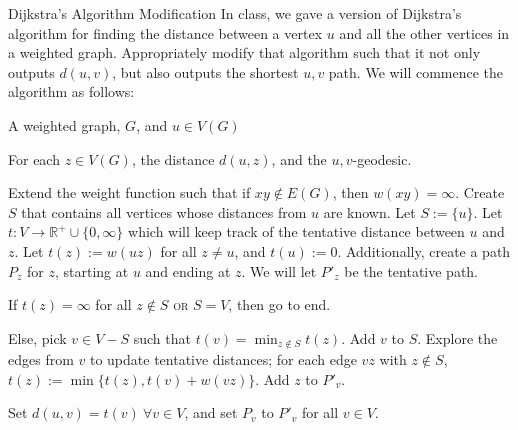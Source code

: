 \documentclass[10pt]{extarticle}
\title{}
\author{Avinash Iyer}
\date{}
\begin{document}
  \begin{problem}{Dijkstra's Algorithm Modification}
    In class, we gave a version of Dijkstra's algorithm for finding the distance between a vertex $u$ and all the other vertices in a weighted graph. Appropriately modify that algorithm such that it not only outputs $d(u,v)$, but also outputs the shortest $u,v$ path.
    \tcblower
    We will commence the algorithm as follows:
    \begin{description}[font=\normalfont\scshape]
      \item[Input] A weighted graph, $G$, and $u\in V(G)$
      \item[Output] For each $z\in V(G)$, the distance $d(u,z)$, and the $u,v$-geodesic.
      \item[Initialization]Extend the weight function such that if $xy\notin E(G)$, then $w(xy) = \infty$. Create $S$ that contains all vertices whose distances from $u$ are known. Let $S := \{u\}$. Let $t:V\rightarrow \mathbb{R}^+ \cup \{0,\infty\}$ which will keep track of the tentative distance between $u$ and $z$. Let $t(z) := w(uz)$ for all $z\neq u$, and $t(u) := 0$. Additionally, create a path $P_{z}$ for $z$, starting at $u$ and ending at $z$. We will let $P'_{z}$ be the tentative path.
      \item[Condition to Terminate Loop] If $t(z) = \infty$ for all $z\notin S$ \textsc{or} $S = V$, then go to end.
      \item[Loop] Else, pick $v\in V-S$ such that $t(v) = \min_{z\notin S} t(z)$. Add $v$ to $S$. Explore the edges from $v$ to update tentative distances; for each edge $vz$ with $z\notin S$, $t(z) := \min\{t(z),t(v) + w(vz)\}$. Add $z$ to $P'_v$.
      \item[End] Set $d(u,v) = t(v)~\forall v\in V$, and set $P_v$ to $P'_v$ for all $v\in V$.
    \end{description}
  \end{problem}
\end{document}
